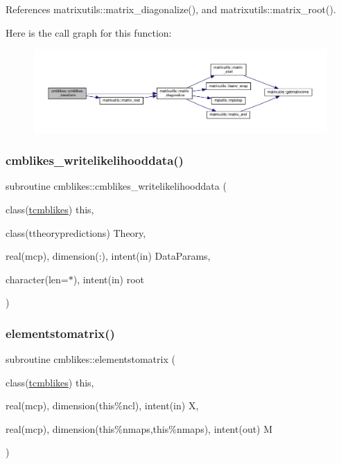 References matrixutils\+::matrix\+\_\+diagonalize(), and matrixutils\+::matrix\+\_\+root().

Here is the call graph for this function\+:
\nopagebreak
\begin{figure}[H]
\begin{center}
\leavevmode
\includegraphics[width=350pt]{namespacecmblikes_a94f791a78bfa0b35f813dc792796de0d_cgraph}
\end{center}
\end{figure}
\mbox{\label{namespacecmblikes_a9befa7145c3914eb9bdd86699681274c}} 
\subsubsection{\texorpdfstring{cmblikes\+\_\+writelikelihooddata()}{cmblikes\_writelikelihooddata()}}
{\footnotesize\ttfamily subroutine cmblikes\+::cmblikes\+\_\+writelikelihooddata (\begin{DoxyParamCaption}\item[{class(\mbox{\hyperlink{structcmblikes_1_1tcmblikes}{tcmblikes}})}]{this,  }\item[{class(ttheorypredictions)}]{Theory,  }\item[{real(mcp), dimension(\+:), intent(in)}]{Data\+Params,  }\item[{character(len=$\ast$), intent(in)}]{root }\end{DoxyParamCaption})\hspace{0.3cm}{\ttfamily [private]}}

\mbox{\label{namespacecmblikes_a2ae7731bcaed3a30ef1314fdb6c7718e}} 
\subsubsection{\texorpdfstring{elementstomatrix()}{elementstomatrix()}}
{\footnotesize\ttfamily subroutine cmblikes\+::elementstomatrix (\begin{DoxyParamCaption}\item[{class(\mbox{\hyperlink{structcmblikes_1_1tcmblikes}{tcmblikes}})}]{this,  }\item[{real(mcp), dimension(this\%ncl), intent(in)}]{X,  }\item[{real(mcp), dimension(this\%nmaps,this\%nmaps), intent(out)}]{M }\end{DoxyParamCaption})\hspace{0.3cm}{\ttfamily [private]}}

